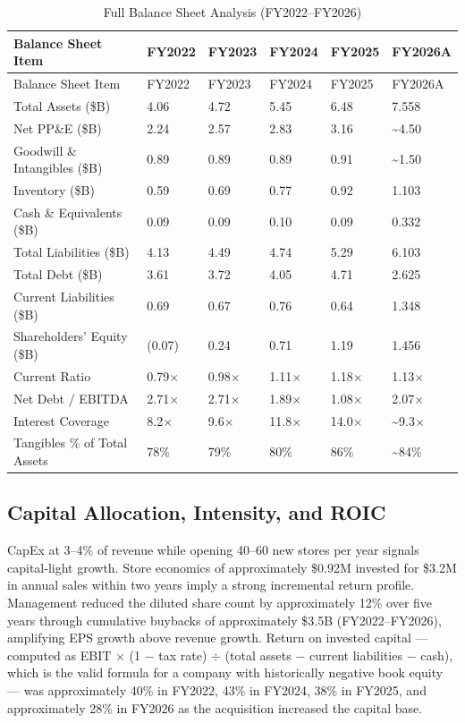 \documentclass[11pt]{article}
\begin{document}
\begingroup
\small
\setlength{\tabcolsep}{4pt}
\setlength{\LTleft}{0pt}
\setlength{\LTright}{0pt}
\begin{longtable}{P{4.2cm} C{2.0cm} C{2.0cm} C{2.0cm} C{2.0cm} C{2.0cm}}
\caption{Full Balance Sheet Analysis (FY2022--FY2026)}\\
\toprule
{}
Balance Sheet Item & FY2022 & FY2023 & FY2024 & FY2025 & FY2026A \\
\midrule
\endfirsthead
\toprule
{}
Balance Sheet Item & FY2022 & FY2023 & FY2024 & FY2025 & FY2026A \\
\midrule
\endhead
Total Assets (\$B) & 4.06 & 4.72 & 5.45 & 6.48 & 7.558 \\
Net PP\&E (\$B) & 2.24 & 2.57 & 2.83 & 3.16 & \textasciitilde{}4.50 \\
Goodwill \& Intangibles (\$B) & 0.89 & 0.89 & 0.89 & 0.91 & \textasciitilde{}1.50 \\
Inventory (\$B) & 0.59 & 0.69 & 0.77 & 0.92 & 1.103 \\
Cash \& Equivalents (\$B) & 0.09 & 0.09 & 0.10 & 0.09 & 0.332 \\
Total Liabilities (\$B) & 4.13 & 4.49 & 4.74 & 5.29 & 6.103 \\
Total Debt (\$B) & 3.61 & 3.72 & 4.05 & 4.71 & 2.625 \\
Current Liabilities (\$B) & 0.69 & 0.67 & 0.76 & 0.64 & 1.348 \\
Shareholders' Equity (\$B) & (0.07) & 0.24 & 0.71 & 1.19 & 1.456 \\
Current Ratio & 0.79$\times$ & 0.98$\times$ & 1.11$\times$ & 1.18$\times$ & 1.13$\times$ \\
Net Debt / EBITDA & 2.71$\times$ & 2.71$\times$ & 1.89$\times$ & 1.08$\times$ & 2.07$\times$ \\
Interest Coverage & 8.2$\times$ & 9.6$\times$ & 11.8$\times$ & 14.0$\times$ & \textasciitilde{}9.3$\times$ \\
Tangibles \% of Total Assets & 78\% & 79\% & 80\% & 86\% & \textasciitilde{}84\% \\
\bottomrule
\end{longtable}
\endgroup

\subsection{Capital Allocation, Intensity, and ROIC}
CapEx at 3--4\% of revenue while opening 40--60 new stores per year signals capital-light growth. Store economics of approximately \$0.92M invested for \$3.2M in annual sales within two years imply a strong incremental return profile. Management reduced the diluted share count by approximately 12\% over five years through cumulative buybacks of approximately \$3.5B (FY2022--FY2026), amplifying EPS growth above revenue growth. Return on invested capital --- computed as EBIT $\times$ (1 $-$ tax rate) $\div$ (total assets $-$ current liabilities $-$ cash), which is the valid formula for a company with historically negative book equity --- was approximately 40\% in FY2022, 43\% in FY2024, 38\% in FY2025, and approximately 28\% in FY2026 as the acquisition increased the capital base.
\end{document}
